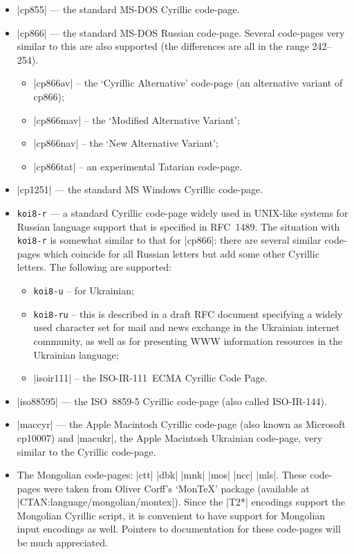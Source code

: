 \documentclass{ltxguide}[1999/02/28]
\begin{document}
\begin{itemize}

\item |cp855| --- the standard \mbox{MS-DOS} Cyrillic code-page.

\item |cp866| --- the standard \mbox{MS-DOS} Russian code-page.
  Several code-pages very similar to this are also supported
  (the differences are all in the range 242--254).
  \begin{itemize}
  \item |cp866av| -- the `Cyrillic Alternative' code-page (an
    alternative variant of cp866);
  \item |cp866mav| --  the `Modified Alternative Variant';
  \item |cp866nav| --  the `New Alternative Variant';
  \item |cp866tat| --  an experimental Tatarian code-page.
  \end{itemize}

\item |cp1251| --- the standard MS Windows Cyrillic code-page.

\item \mbox{\texttt{koi8-r}} --- a standard Cyrillic code-page widely
  used in UNIX-like systems for Russian language support that is
  specified in RFC~1489.  The situation with \mbox{\texttt{koi8-r}} is
  somewhat similar to that for |cp866|: there are several similar
  code-pages which coincide for all Russian letters but add some other
  Cyrillic letters. The following are supported:
  \begin{itemize}
  \item \mbox{\texttt{koi8-u}}  -- for Ukrainian;
  \item \mbox{\texttt{koi8-ru}} -- this is described in a draft RFC
    document specifying a widely used character set for mail and news
    exchange in the Ukrainian internet community, as well as for
    presenting WWW information resources in the Ukrainian language;
  \item |isoir111| -- the \mbox{ISO-IR-111 ECMA} Cyrillic Code Page.
  \end{itemize}

\item |iso88595| --- the \mbox{ISO 8859-5} Cyrillic code-page (also called
  \mbox{ISO-IR-144}).

\item |maccyr| --- the Apple Macintosh Cyrillic code-page (also known
  as Microsoft cp10007) and |macukr|, the Apple Macintosh Ukrainian
  code-page, very similar to the Cyrillic code-page.

\item The Mongolian code-pages: |ctt| |dbk| |mnk| |mos| |ncc| |mls|.
  These code-pages were taken from Oliver Corff's `Mon\TeX' package
  (available at |CTAN:language/mongolian/montex|).  Since the |T2*|
  encodings support the Mongolian Cyrillic script, it is convenient to
  have support for Mongolian input encodings as well.  Pointers to
  documentation for these code-pages will be much appreciated.

\end{itemize}
\end{document}

